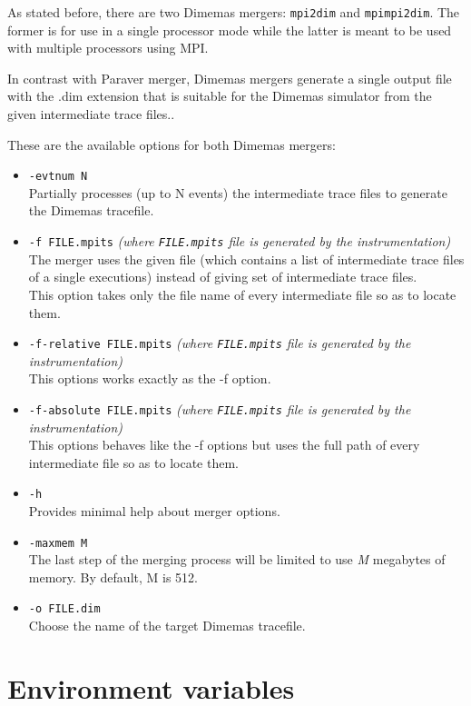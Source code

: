 As stated before, there are two Dimemas mergers: {\tt mpi2dim} and {\tt mpimpi2dim}. The former is for use in a single processor mode while the latter is meant to be used with multiple processors using MPI.

In contrast with Paraver merger, Dimemas mergers generate a single output file with the .dim extension that is suitable for the Dimemas simulator from the given intermediate trace files..

These are the available options for both Dimemas mergers:

\begin{itemize}
 \item {\tt -evtnum N}\\
 Partially processes (up to N events) the intermediate trace files to generate the Dimemas tracefile.
 \item {\tt -f FILE.mpits} {\em (where {\tt FILE.mpits} file is generated by the instrumentation)}\\
 The merger uses the given file (which contains a list of intermediate trace files of a single executions) instead of giving set of intermediate trace files.\\
 This option takes only the file name of every intermediate file so as to locate them.
 \item {\tt -f-relative FILE.mpits} {\em (where {\tt FILE.mpits} file is generated by the instrumentation)}\\
 This options works exactly as the -f option.
 \item {\tt -f-absolute FILE.mpits} {\em (where {\tt FILE.mpits} file is generated by the instrumentation)}\\
 This options behaves like the -f options but uses the full path of every intermediate file so as to locate them.
 \item {\tt -h}\\
 Provides minimal help about merger options.
 \item {\tt -maxmem M}\\
 The last step of the merging process will be limited to use {\em M} megabytes of memory. By default, M is 512.
 \item {\tt -o FILE.dim}\\
 Choose the name of the target Dimemas tracefile.
\end{itemize}

\section{Environment variables}

